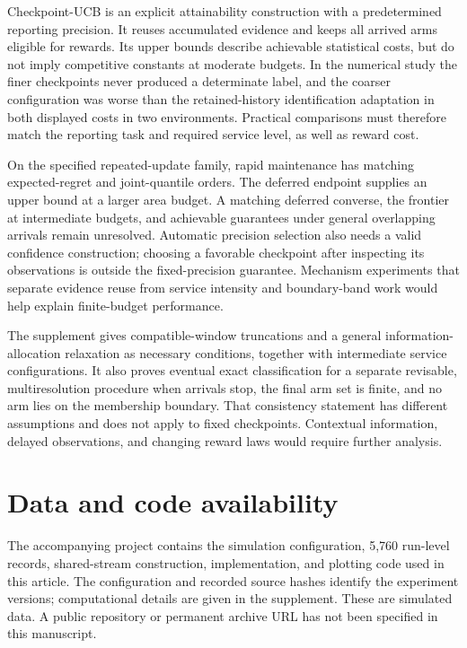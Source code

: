\documentclass[11pt]{article}
\theoremstyle{remark}
\begin{document}
Checkpoint-UCB is an explicit attainability construction with a
predetermined reporting precision. It reuses accumulated evidence and
keeps all arrived arms eligible for rewards. Its upper bounds describe
achievable statistical costs, but do not imply competitive constants at
moderate budgets. In the numerical study the finer checkpoints never
produced a determinate label, and the coarser configuration was worse
than the retained-history identification adaptation in both displayed
costs in two environments. Practical comparisons must therefore match
the reporting task and required service level, as well as reward cost.

On the specified repeated-update family, rapid maintenance has matching
expected-regret and joint-quantile orders. The deferred endpoint supplies
an upper bound at a larger area budget. A matching deferred converse,
the frontier at intermediate budgets, and achievable guarantees under
general overlapping arrivals remain unresolved. Automatic precision
selection also needs a valid confidence construction; choosing a
favorable checkpoint after inspecting its observations is outside the
fixed-precision guarantee. Mechanism experiments that separate evidence
reuse from service intensity and boundary-band work would help explain
finite-budget performance.

The supplement gives compatible-window truncations and a general
information-allocation relaxation as necessary conditions, together with
intermediate service configurations. It also proves eventual exact
classification for a separate revisable, multiresolution procedure when
arrivals stop, the final arm set is finite, and no arm lies on the
membership boundary. That consistency statement has different
assumptions and does not apply to fixed checkpoints. Contextual
information, delayed observations, and changing reward laws would require
further analysis.

\section*{Data and code availability}
The accompanying project contains the simulation configuration, 5,760
run-level records, shared-stream construction, implementation, and
plotting code used in this article. The configuration and recorded source
hashes identify the experiment versions; computational details are given
in the supplement. These are simulated data. A public repository or
permanent archive URL has not been specified in this manuscript.



\end{document}
